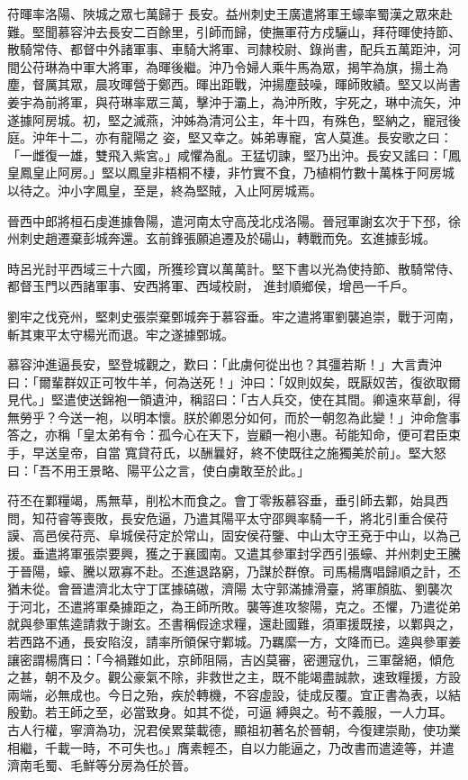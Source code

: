 \begin{pinyinscope}
 苻暉率洛陽、陜城之眾七萬歸于
 長安。益州刺史王廣遣將軍王蠔率蜀漢之眾來赴難。堅聞慕容沖去長安二百餘里，引師而歸，使撫軍苻方戍驪山，拜苻暉使持節、散騎常侍、都督中外諸軍事、車騎大將軍、司隸校尉、錄尚書，配兵五萬距沖，河間公苻琳為中軍大將軍，為暉後繼。沖乃令婦人乘牛馬為眾，揭竿為旗，揚土為塵，督厲其眾，晨攻暉營于鄭西。暉出距戰，沖揚塵鼓噪，暉師敗績。堅又以尚書姜宇為前將軍，與苻琳率眾三萬，擊沖于灞上，為沖所敗，宇死之，琳中流矢，沖遂據阿房城。初，堅之滅燕，沖姊為清河公主，年十四，有殊色，堅納之，寵冠後庭。沖年十二，亦有龍陽之
 姿，堅又幸之。姊弟專寵，宮人莫進。長安歌之曰：「一雌復一雄，雙飛入紫宮。」咸懼為亂。王猛切諫，堅乃出沖。長安又謠曰：「鳳皇鳳皇止阿房。」堅以鳳皇非梧桐不棲，非竹實不食，乃植桐竹數十萬株于阿房城以待之。沖小字鳳皇，至是，終為堅賊，入止阿房城焉。



 晉西中郎將桓石虔進據魯陽，遣河南太守高茂北戍洛陽。晉冠軍謝玄次于下邳，徐州刺史趙遷棄彭城奔還。玄前鋒張願追遷及於碭山，轉戰而免。玄進據彭城。



 時呂光討平西域三十六國，所獲珍寶以萬萬計。堅下書以光為使持節、散騎常侍、都督玉門以西諸軍事、安西將軍、西域校尉，
 進封順鄉侯，增邑一千戶。



 劉牢之伐兗州，堅刺史張崇棄鄄城奔于慕容垂。牢之遣將軍劉襲追崇，戰于河南，斬其東平太守楊光而退。牢之遂據鄄城。



 慕容沖進逼長安，堅登城觀之，歎曰：「此虜何從出也？其彊若斯！」大言責沖曰：「爾輩群奴正可牧牛羊，何為送死！」沖曰：「奴則奴矣，既厭奴苦，復欲取爾見代。」堅遣使送錦袍一領遺沖，稱詔曰：「古人兵交，使在其間。卿遠來草創，得無勞乎？今送一袍，以明本懷。朕於卿恩分如何，而於一朝忽為此變！」沖命詹事答之，亦稱「皇太弟有令：孤今心在天下，豈顧一袍小惠。茍能知命，便可君臣束手，早送皇帝，自當
 寬貸苻氏，以酬曩好，終不使既往之施獨美於前」。堅大怒曰：「吾不用王景略、陽平公之言，使白虜敢至於此。」



 苻丕在鄴糧竭，馬無草，削松木而食之。會丁零叛慕容垂，垂引師去鄴，始具西問，知苻睿等喪敗，長安危逼，乃遣其陽平太守邵興率騎一千，將北引重合侯苻謨、高邑侯苻亮、阜城侯苻定於常山，固安侯苻鑒、中山太守王兗于中山，以為己援。垂遣將軍張崇要興，獲之于襄國南。又遣其參軍封孚西引張蠔、并州刺史王騰于晉陽，蠔、騰以眾寡不赴。丕進退路窮，乃謀於群僚。司馬楊膺唱歸順之計，丕猶未從。會晉遣濟北太守丁匡據碻磝，濟陽
 太守郭滿據滑臺，將軍顏肱、劉襲次于河北，丕遣將軍桑據距之，為王師所敗。襲等進攻黎陽，克之。丕懼，乃遣從弟就與參軍焦逵請救于謝玄。丕書稱假途求糧，還赴國難，須軍援既接，以鄴與之，若西路不通，長安陷沒，請率所領保守鄴城。乃羈縻一方，文降而已。逵與參軍姜讓密謂楊膺曰：「今禍難如此，京師阻隔，吉凶莫審，密邇寇仇，三軍罄絕，傾危之甚，朝不及夕。觀公豪氣不除，非救世之主，既不能竭盡誠款，速致糧援，方設兩端，必無成也。今日之殆，疾於轉機，不容虛設，徒成反覆。宜正書為表，以結殷勤。若王師之至，必當致身。如其不從，可逼
 縛與之。茍不義服，一人力耳。古人行權，寧濟為功，況君侯累葉載德，顯祖初著名於晉朝，今復建崇勛，使功業相繼，千載一時，不可失也。」膺素輕丕，自以力能逼之，乃改書而遣逵等，并遣濟南毛蜀、毛鮮等分房為任於晉。




\end{pinyinscope}
